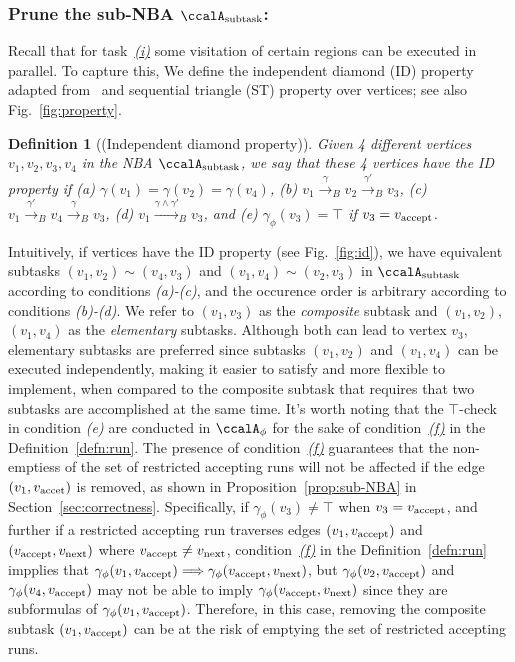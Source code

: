 \documentclass[Afour,sageh,times]{sagej}
\newtheorem{defn}[thm]{Definition}
\newcommand{\auto}[1]{\ccalA_{\textup{#1}}}
\newcommand{\autop}{\ccalA_{\phi}}
\newcommand{\vertex}[1]{v_{\textup{#1}}}
\newcommand{\simplies}{\DOTSB\Longrightarrow}
\begin{document}
  \subsubsection{Prune the sub-NBA \upshape $\auto{subtask}$:} \label{sub-NBA:2}
Recall that for task~\hyperref[task:i]{\it (i)}  some visitation of certain regions can be executed in parallel. To capture this, We define the independent diamond (ID) property adapted from~\cite{stefanescu2006automatic}  and sequential triangle (ST) property over vertices; see also Fig.~\ref{fig:property}.
\begin{defn}[(Independent diamond property)]\label{defn:id}
  Given 4 different vertices $v_1, v_2, v_3, v_4$ in the NBA $\auto{subtask}$, we say that these 4 vertices have the ID property if (a) $\gamma(v_1) = \gamma(v_2) = \gamma(v_4)$, (b) $v_1 \xrightarrow{\gamma}_B v_2 \xrightarrow{\gamma'}_B v_3$, (c) $v_1 \xrightarrow{\gamma'}_B v_4 \xrightarrow{\gamma}_B v_3$,  (d) $v_1 \xrightarrow{\gamma \wedge \gamma'}_B v_3$, and (e) $\gamma_{\phi}(v_3) = \top$ if $v_3 = \vertex{accept}$.
\end{defn}
Intuitively, if vertices have the ID property (see Fig.~\ref{fig:id}), we have equivalent subtasks $(v_1, v_2) \sim (v_4, v_3)$ and $(v_1, v_4) \sim (v_2, v_3)$ in $\auto{subtask}$ according to conditions {\it (a)-(c)}, and the occurence order is arbitrary according to conditions {\it (b)-(d)}.  We refer to $(v_1, v_3)$ as the {\it composite} subtask and $(v_1, v_2)$, $(v_1, v_4)$ as the {\it elementary} subtasks.  Although both can lead to vertex $v_3$, elementary subtasks are preferred since subtasks $(v_1, v_2)$ and $(v_1, v_4)$ can be executed independently, making it easier to satisfy and more flexible to implement, when compared to the composite subtask that requires that two subtasks are accomplished at the same time. It's worth noting that the $\top$-check in condition {\it (e)} are conducted in $\autop$ for the sake of condition~\hyperref[cond:f]{\it (f)} in the Definition~\ref{defn:run}. The presence of condition~\hyperref[cond:f]{\it (f)} guarantees that the non-emptiess of the set of restricted accepting runs will not be affected if the edge $(v_1, \vertex{accet})$ is removed,  as shown in Proposition~\ref{prop:sub-NBA} in Section~\ref{sec:correctness}. Specifically, if $\gamma_{\phi}(v_3) \ne \top$ when $v_3 = \vertex{accept}$, and further if a restricted accepting run traverses edges $(v_1, \vertex{accept})$ and $(\vertex{accept}, \vertex{next})$ where $\vertex{accept}\neq \vertex{next}$, condition~\hyperref[cond:f]{\it (f)} in the Definition~\ref{defn:run} impplies  that $\gamma_{\phi}(v_1, \vertex{accept}) \simplies \gamma_{\phi}(\vertex{accept}, \vertex{next})$, but $\gamma_{\phi}(v_2, \vertex{accept})$ and $\gamma_{\phi}(v_4, \vertex{accept})$ may not be able to imply $\gamma_{\phi}(\vertex{accept}, \vertex{next})$ since they are subformulas of $\gamma_{\phi}(v_1, \vertex{accept})$. Therefore, in this case, removing the composite subtask $(v_1, \vertex{accept})$ can be at the risk of emptying the  set of restricted accepting runs.
\end{document}
